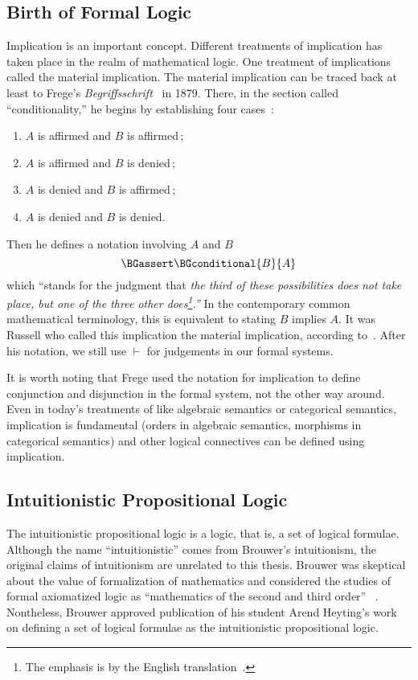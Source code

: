 \subsection{Birth of Formal Logic}

Implication is an important concept.
Different treatments of implication has taken place in the realm of
mathematical logic.
One treatment of implications called the material implication.
The material implication can be traced back at least to
Frege's \textit{Begriffsschrift}~\citep{frege} in 1879.  There, in the
section called
``conditionality,''
he begins by establishing four cases~\citep[p.~13]{frege}:
\begin{enumerate}
 \item $A$ is affirmed and $B$ is affirmed\,;
 \item $A$ is affirmed and $B$ is denied\,;
 \item $A$ is denied and $B$ is affirmed\,;
 \item $A$ is denied and $B$ is denied.
\end{enumerate}
Then he defines a notation involving $A$ and $B$
\[
\BGassert\BGconditional{B}{A}
\]
which ``stands for the
judgment that \textit{the third of these possibilities does not take
place, but one of the three other does\footnote{The emphasis is by
the English translation~\citep[p.~14]{frege}.}.''}
In the contemporary common mathematical terminology, this is equivalent
to stating $B$ implies $A$.
It was Russell who called this implication the material implication,
according to~\citet{sep-conditionals}.
After his notation, we still use $\vdash$ for judgements in our formal systems.

It is worth noting that Frege used the notation for implication to define conjunction and
disjunction in the formal system, not the other way around.  Even in
today's treatments of
like algebraic semantics or categorical semantics, implication is
fundamental (orders in algebraic semantics, morphisms in categorical
semantics) and other logical connectives
can be defined using implication.

\subsection{Intuitionistic Propositional Logic}

The intuitionistic propositional logic is a logic, that is, a set of
logical formulae.
Although the name ``intuitionistic'' comes from Brouwer's intuitionism,
the original claims of intuitionism are unrelated to this thesis.
Brouwer was skeptical about the value of formalization of
mathematics and considered the studies of formal axiomatized logic as
``mathematics of the second and third order''
~.
Nontheless, Brouwer approved publication of his student Arend Heyting's
work on defining a set of logical formulae as the intuitionistic
propositional logic.

